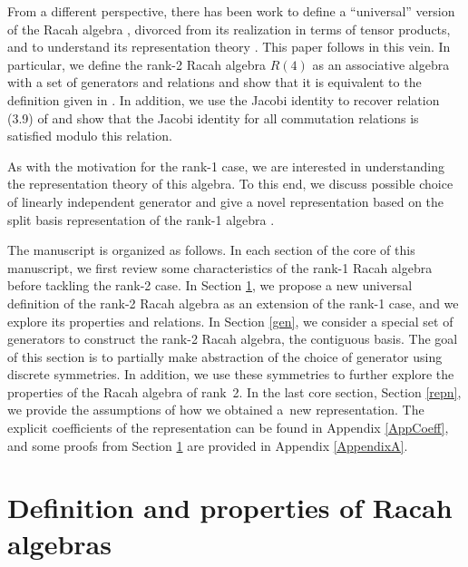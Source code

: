 \documentclass[10pt,a4paper]{amsart}
\numberwithin{equation}{section}
\begin{document}
From a different perspective, there has been work to define a ``universal'' version of the Racah algebra \cite{BCH2020,CGPAV22}, divorced from its realization in terms of tensor products, and to understand its representation theory \cite{HBC2020}. This paper follows in this vein. In particular, we define the rank-2 Racah algebra $R(4)$ as an associative algebra with a set of generators and relations and show that it is equivalent to the definition given in \cite{CGPAV22}. In addition, we use the Jacobi identity to recover relation (3.9) of \cite{CGPAV22} and show that the Jacobi identity for all commutation relations is satisfied modulo this relation.

As with the motivation for the rank-1 case, we are interested in understanding the representation theory of this algebra. To this end, we discuss possible choice of linearly independent generator and give a novel representation based on the split basis representation of the rank-1 algebra \cite{HBC2020}.



The manuscript is organized as follows. In each section of the core of this manuscript, we first review some characteristics of the rank-1 Racah algebra before tackling the rank-2 case.
In Section \ref{defn}, we propose a new universal definition of the rank-2 Racah algebra as an extension of the rank-1 case, and we explore its properties and relations. In Section \ref{gen}, we consider a special set of generators to construct the rank-2 Racah algebra, the contiguous basis. The goal of this section is to partially make abstraction of the choice of generator using discrete symmetries. In addition, we use these symmetries to further explore the properties of the Racah algebra of rank~2. In the last core section, Section \ref{repn}, we provide the assumptions of how we obtained a~new representation. The explicit coefficients of the representation can be found in Appendix \ref{AppCoeff}, and some proofs from Section \ref{defn} are provided in Appendix \ref{AppendixA}.

\section{Definition and properties of Racah algebras}
\label{defn}
\end{document}
